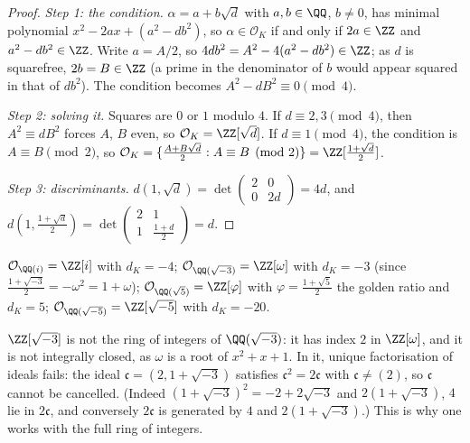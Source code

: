 \begin{proof}
\emph{Step 1: the condition.} $\alpha = a + b\sqrt d$ with $a, b \in \QQ$, $b \neq 0$, has minimal polynomial $x^2 - 2ax + (a^2 - db^2)$, so $\alpha \in \mathcal{O}_K$ if and only if $2a \in \ZZ$ and
$a^2 - db^2 \in \ZZ$. Write $a = A/2$, so $4db^2 = A^2 - 4(a^2 - db^2) \in \ZZ$; as $d$ is squarefree, $2b = B \in \ZZ$ (a prime in the denominator of $b$ would appear squared in that of $db^2$). The
condition becomes $A^2 - dB^2 \equiv 0 \pmod 4$.

\emph{Step 2: solving it.} Squares are $0$ or $1$ modulo $4$. If $d \equiv 2, 3 \pmod 4$, then $A^2 \equiv dB^2$ forces $A$, $B$ even, so $\mathcal{O}_K = \ZZ[\sqrt d]$. If $d \equiv 1 \pmod 4$, the
condition is $A \equiv B \pmod 2$, so $\mathcal{O}_K = \{\frac{A + B\sqrt d}{2} : A \equiv B \pmod 2\} = \ZZ[\frac{1 + \sqrt d}{2}]$.

\emph{Step 3: discriminants.} $d(1, \sqrt d) = \det\begin{pmatrix} 2 & 0\\ 0 & 2d\end{pmatrix} = 4d$, and $d(1, \frac{1 + \sqrt d}{2}) = \det\begin{pmatrix} 2 & 1\\ 1 & \frac{1 + d}{2}\end{pmatrix} = d$.
\end{proof}

\begin{example}\label{algebraic-number-theory:example-rings-of-integers}
$\mathcal{O}_{\QQ(i)} = \ZZ[i]$ with $d_K = -4$; $\mathcal{O}_{\QQ(\sqrt{-3})} = \ZZ[\omega]$ with $d_K = -3$ (since $\frac{1 + \sqrt{-3}}{2} = -\omega^2 = 1 + \omega$); $\mathcal{O}_{\QQ(\sqrt5)} = \ZZ[\varphi]$ with
$\varphi = \frac{1 + \sqrt5}{2}$ the golden ratio and $d_K = 5$; $\mathcal{O}_{\QQ(\sqrt{-5})} = \ZZ[\sqrt{-5}]$ with $d_K = -20$.
\end{example}

\begin{counterexample}\label{algebraic-number-theory:counterexample-not-maximal}
$\ZZ[\sqrt{-3}]$ is not the ring of integers of $\QQ(\sqrt{-3})$: it has index $2$ in $\ZZ[\omega]$, and it is not integrally closed, as $\omega$ is a root of $x^2 + x + 1$. In it, unique factorisation of
ideals fails: the ideal $\mathfrak{c} = (2, 1 + \sqrt{-3})$ satisfies $\mathfrak{c}^2 = 2\mathfrak{c}$ with $\mathfrak{c} \neq (2)$, so $\mathfrak{c}$ cannot be cancelled. (Indeed $(1 + \sqrt{-3})^2 = -2 + 2\sqrt{-3}$ and
$2(1 + \sqrt{-3})$, $4$ lie in $2\mathfrak{c}$, and conversely $2\mathfrak{c}$ is generated by $4$ and $2(1 + \sqrt{-3})$.) This is why one works with the full ring of integers.
\end{counterexample}

